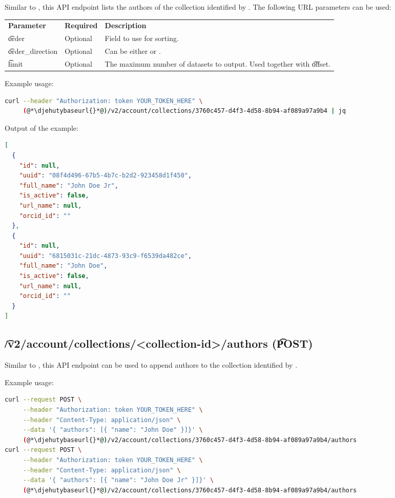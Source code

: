   Similar to , this API endpoint lists the
  authors of the collection identified by .
  The following URL parameters can be used:

\begin{tabularx}{\textwidth}{*{2}{!{\VRule[-1pt]}l}!{\VRule[-1pt]}X}
  \headrow
  \textbf{Parameter}   & \textbf{Required} & \textbf{Description}\\
  \t{order}            & Optional & Field to use for sorting.\\
  \t{order\_direction} & Optional & Can be either  or .\\
  \t{limit}            & Optional & The maximum number of datasets to output.
                                    Used together with \t{offset}.
\end{tabularx}

  Example usage:
\begin{lstlisting}[language=bash]
curl --header "Authorization: token YOUR_TOKEN_HERE" \
     (@*\djehutybaseurl{}*@)/v2/account/collections/3760c457-d4f3-4d58-8b94-af089a97a9b4 | jq
\end{lstlisting}

  Output of the example:
\begin{lstlisting}[language=JSON]
[
  {
    "id": null,
    "uuid": "08f4d496-67b5-4b7c-b2d2-923458d1f450",
    "full_name": "John Doe Jr",
    "is_active": false,
    "url_name": null,
    "orcid_id": ""
  },
  {
    "id": null,
    "uuid": "6815031c-21dc-4873-93c9-f6539da482ce",
    "full_name": "John Doe",
    "is_active": false,
    "url_name": null,
    "orcid_id": ""
  }
]
\end{lstlisting}

\subsection{\t{/v2/account/collections/<collection-id>/authors} (\t{POST})}
\label{sec:api-v2-collections-authors-post}

  Similar to , this API endpoint can
  be used to append authors to the collection identified by .

  Example usage:
\begin{lstlisting}[language=bash]
curl --request POST \
     --header "Authorization: token YOUR_TOKEN_HERE" \
     --header "Content-Type: application/json" \
     --data '{ "authors": [{ "name": "John Doe" }]}' \
     (@*\djehutybaseurl{}*@)/v2/account/collections/3760c457-d4f3-4d58-8b94-af089a97a9b4/authors
curl --request POST \
     --header "Authorization: token YOUR_TOKEN_HERE" \
     --header "Content-Type: application/json" \
     --data '{ "authors": [{ "name": "John Doe Jr" }]}' \
     (@*\djehutybaseurl{}*@)/v2/account/collections/3760c457-d4f3-4d58-8b94-af089a97a9b4/authors
\end{lstlisting}

